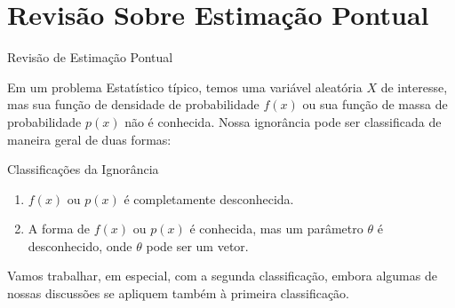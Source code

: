 \documentclass[12pt]{beamer}
\begin{document}
%

\section{Revisão Sobre Estimação Pontual}

\begin{frame}{Revisão de Estimação Pontual}
	\begin{block}{}
		\justifying
		Em um problema Estatístico típico, temos uma variável aleatória $X$ de interesse, mas sua função de densidade de probabilidade $f(x)$ ou sua função de massa de probabilidade $p(x)$ não é conhecida. Nossa ignorância pode ser classificada de maneira geral de duas formas:
	\end{block}
	\pause
	\begin{block}{Classificações da Ignorância}
		\begin{enumerate}
			\item $f(x)$ ou $p(x)$ é completamente desconhecida.
			\item A forma de $f(x)$ ou $p(x)$ é conhecida, mas um parâmetro $\theta$ é desconhecido, onde $\theta$ pode ser um vetor.
		\end{enumerate}
			\justifying
		Vamos trabalhar, em especial, com a segunda classificação, embora algumas de nossas discussões se apliquem também à primeira classificação.
	\end{block}
\end{frame}
\end{document}

